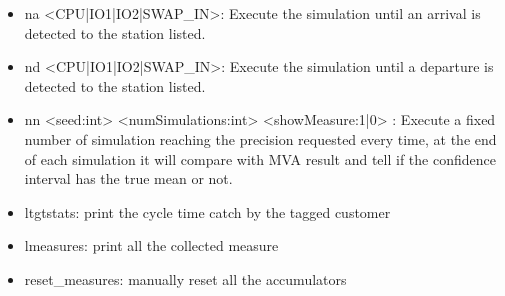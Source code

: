 \documentclass[12pt,a4paper]{article}
\begin{document}
\begin{itemize}
    \item na <CPU|IO1|IO2|SWAP\_IN>: Execute the simulation until an arrival is detected to the station listed.
    \item nd <CPU|IO1|IO2|SWAP\_IN>: Execute the simulation until a departure is detected to the station listed.
    \item nn <seed:int> <numSimulations:int> <showMeasure:1|0> : Execute a fixed number of simulation reaching the precision requested every time, at the end of each simulation it will compare with MVA result and tell if the confidence interval has the true mean or not.
    \item ltgtstats: print the cycle time catch by the tagged customer
    \item lmeasures: print all the collected measure
    \item reset\_measures: manually reset all the accumulators

\end{itemize}
\end{document}
